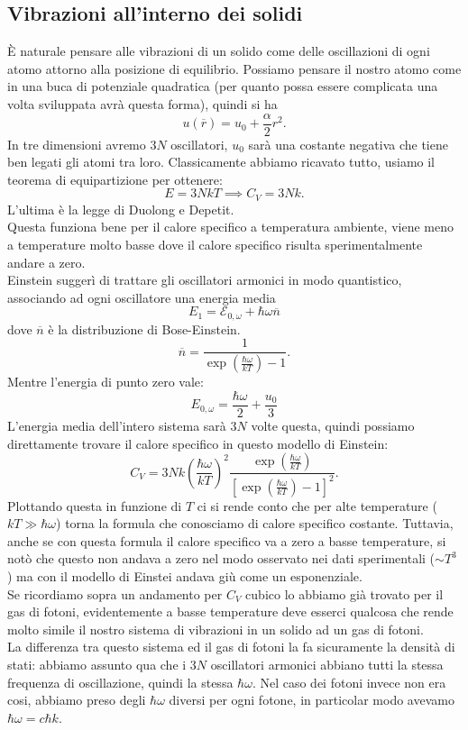 \subsection{Vibrazioni all'interno dei solidi}%
È naturale pensare alle vibrazioni di un solido come delle oscillazioni di ogni atomo attorno alla posizione di equilibrio. Possiamo pensare il nostro atomo come in una buca di potenziale quadratica (per quanto possa essere complicata una volta sviluppata avrà questa forma), quindi si ha 
\[
	u( \overline{r}) = u_0+ \frac{\alpha }{2}r^2
.\] 
In tre dimensioni avremo $3N$ oscillatori, $u_0$ sarà una costante negativa che tiene ben legati gli atomi tra loro. Classicamente abbiamo ricavato tutto, usiamo il teorema di equipartizione per ottenere:
\[
	E = 3N kT \implies C_{V} = 3Nk
.\] 
L'ultima è la legge di Duolong e Depetit.\\
Questa funziona bene per il calore specifico a temperatura ambiente, viene meno a temperature molto basse dove il calore specifico risulta sperimentalmente andare a zero.\\
Einstein suggerì di trattare gli oscillatori armonici in modo quantistico, associando ad ogni oscillatore una energia media 
\[
	E_1=\mathcal{E} _{0,\omega } + \hbar\omega \overline{n}
\]
dove $\overline{n}$ è la distribuzione di Bose-Einstein.
\[
	\overline{n} = \frac{1}{\exp\left( \frac{\hbar \omega }{kT} \right) -1}
.\] 
Mentre l'energia di punto zero vale: 
\[
	E_{0, \omega } = \frac{\hbar \omega }{2} + \frac{u_0}{3}
\]
L'energia media dell'intero sistema sarà $3N$ volte questa, quindi possiamo direttamente trovare il calore specifico in questo modello di Einstein:
\[
	C_{V} = 3Nk\left( \frac{\hbar\omega }{kT} \right) ^2 
	\frac{\exp\left( \frac{\hbar\omega }{kT} \right) }{\left[ \exp\left( \frac{\hbar\omega }{kT} \right) -1 \right] ^2}
.\] 
Plottando questa in funzione di $T$ ci si rende conto che per alte temperature ($kT \gg \hbar \omega $) torna la formula che conosciamo di calore specifico costante. 
Tuttavia, anche se con questa formula il calore specifico va a zero a basse temperature, si notò che questo non andava a zero nel modo osservato nei dati sperimentali ($\sim T^{3}$) ma con il modello di Einstei andava giù come un esponenziale.\\
Se ricordiamo sopra un andamento per $C_{V}$ cubico lo abbiamo già trovato per il gas di fotoni, evidentemente a basse temperature deve esserci qualcosa che rende molto simile il nostro sistema di vibrazioni in un solido ad un gas di fotoni.\\
La differenza tra questo sistema ed il gas di fotoni la fa sicuramente la densità di stati: abbiamo assunto qua che i $3N$ oscillatori armonici abbiano tutti la stessa frequenza di oscillazione, quindi la stessa $\hbar\omega $. Nel caso dei fotoni invece non era cosi, abbiamo preso degli $\hbar\omega $ diversi per ogni fotone, in particolar modo avevamo  $\hbar\omega = c \hbar k$.\\
